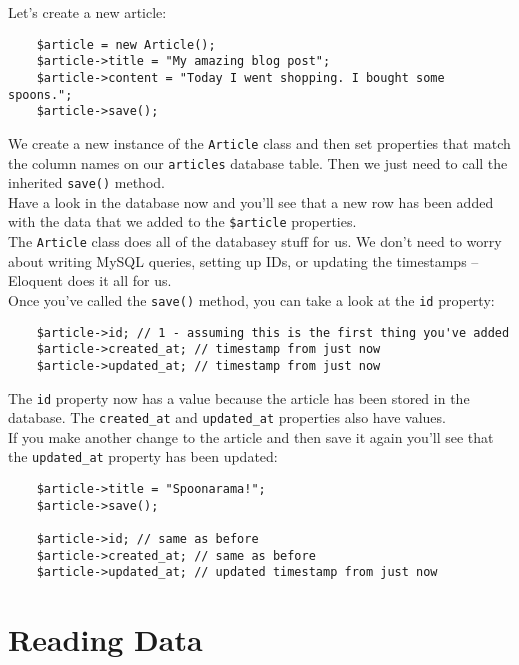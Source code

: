Let's create a new article:

\begin{verbatim}
    $article = new Article();
    $article->title = "My amazing blog post";
    $article->content = "Today I went shopping. I bought some spoons.";
    $article->save();
\end{verbatim}

We create a new instance of the \texttt{Article} class and then set properties that match the column names on our \texttt{articles} database table. Then we just need to call the inherited \texttt{save()} method.
\\

Have a look in the database now and you'll see that a new row has been added with the data that we added to the \texttt{\$article} properties.
\\

The \texttt{Article} class does all of the databasey stuff for us. We don't need to worry about writing MySQL queries, setting up IDs, or updating the timestamps – Eloquent does it all for us.
\\

Once you've called the \texttt{save()} method, you can take a look at the \texttt{id} property:

\begin{verbatim}
    $article->id; // 1 - assuming this is the first thing you've added
    $article->created_at; // timestamp from just now
    $article->updated_at; // timestamp from just now
\end{verbatim}

The \texttt{id} property now has a value because the article has been stored in the database. The \texttt{created\_at} and \texttt{updated\_at} properties also have values.
\\

If you make another change to the article and then save it again you'll see that the \texttt{updated\_at} property has been updated:

\begin{verbatim}
    $article->title = "Spoonarama!";
    $article->save();

    $article->id; // same as before
    $article->created_at; // same as before
    $article->updated_at; // updated timestamp from just now
\end{verbatim}


\section{Reading Data}

